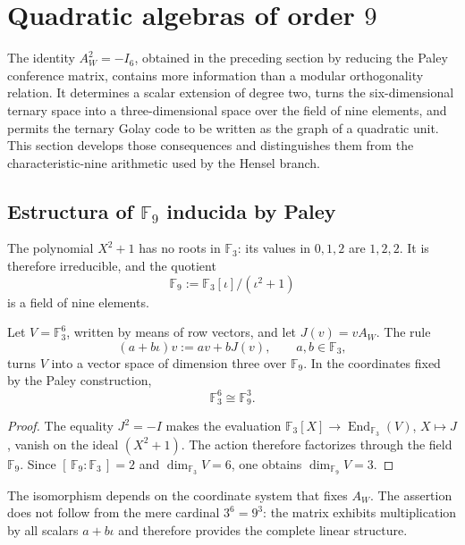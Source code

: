 \chapter{Quadratic algebras of order \(9\)}
\label{chap:algebras-cuadraticas-orden-nueve}

The identity \(A_W^2=-I_6\), obtained in the preceding section by reducing
the Paley conference matrix, contains more information than a
modular orthogonality relation. It determines a scalar extension of degree two,
turns the six-dimensional ternary space into a three-dimensional space
over the field of nine elements, and permits the ternary Golay code to be
written as the graph of a quadratic unit. This section develops
those consequences and distinguishes them from the characteristic-nine arithmetic
used by the Hensel branch.

\section{Estructura of \texorpdfstring{\(\mathbb F_9\)}{F9} inducida by Paley}

The polynomial \(X^2+1\) has no roots in \(\mathbb F_3\): its values in
\(0,1,2\) are \(1,2,2\). It is therefore irreducible, and the quotient
\[
 \mathbb F_9
 :=\mathbb F_3[\iota]/(\iota^2+1)
\]
is a field of nine elements.

\begin{theorem}
\label{thm:f9-tres-desde-paley}
Let \(V=\mathbb F_3^6\), written by means of row vectors, and let
\(J(v)=vA_W\). The rule
\[
 (a+b\iota)v:=av+bJ(v),
 \qquad a,b\in\mathbb F_3,
\]
turns \(V\) into a vector space of dimension three over
\(\mathbb F_9\). In the coordinates fixed by the Paley construction,
\[
 \mathbb F_3^6\cong\mathbb F_9^3.
\]
\end{theorem}

\begin{proof}
The equality \(J^2=-I\) makes the evaluation
\(\mathbb F_3[X]\to\operatorname{End}_{\mathbb F_3}(V)\), \(X\mapsto J\),
vanish on the ideal \((X^2+1)\). The action therefore factorizes through
the field \(\mathbb F_9\). Since
\([\,\mathbb F_9:\mathbb F_3\,]=2\) and
\(\dim_{\mathbb F_3}V=6\), one obtains
\(\dim_{\mathbb F_9}V=3\).
\end{proof}

The isomorphism depends on the coordinate system that fixes \(A_W\). The
assertion does not follow from the mere cardinal \(3^6=9^3\): the matrix exhibits
multiplication by all scalars \(a+b\iota\) and therefore provides the
complete linear structure.

